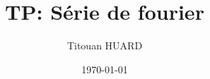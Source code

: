 \documentclass[a4paper,12pt]{article}
\author{Titouan HUARD}
\date{\today}
\begin{document}
\title{TP: Série de fourier}
\end{document}

